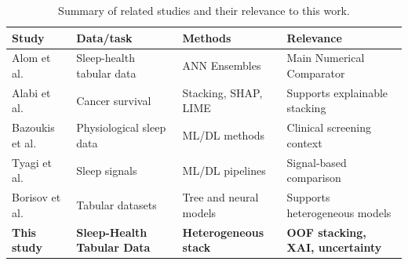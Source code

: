 \documentclass[a4paper,fleqn]{cas-dc}
\begin{document}
\begin{table}[width=\textwidth,pos=!tbp]

\centering

\caption{Summary of related studies and their relevance to this work.}

\label{tab:related_work}

\small

\setlength{\tabcolsep}{4pt}

\renewcommand{\arraystretch}{1.05}

\begin{tabularx}{\textwidth}{@{}Q{0.18\textwidth}Q{0.22\textwidth}Q{0.23\textwidth}Y@{}}

\toprule

Study & Data/task & Methods & Relevance \\

\midrule

Alom et al. \cite{alom2024} &

Sleep-health tabular data &

ANN Ensembles &

Main Numerical Comparator \\

Alabi et al. \cite{alabi2023} &

Cancer survival &

Stacking, SHAP, LIME &

Supports explainable stacking \\

Bazoukis et al. \cite{bazoukis2023} &

Physiological sleep data &

ML/DL methods &

Clinical screening context \\

Tyagi et al. \cite{tyagi2023} &

Sleep signals &

ML/DL pipelines &

Signal-based comparison \\

Borisov et al. \cite{borisov2024} &

Tabular datasets &

Tree and neural models &

Supports heterogeneous models \\

\textbf{This study} &

\textbf{Sleep-Health Tabular Data} &

\textbf{Heterogeneous stack} &

\textbf{OOF stacking, XAI, uncertainty} \\

\bottomrule

\end{tabularx}

\end{table}
\end{document}
